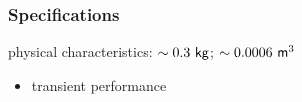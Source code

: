 \subsubsection{Specifications}
physical characteristics: $\sim 0.3 \ \mathsf{kg}$; $\sim 0.0006 \ \mathsf{m}^3$
\begin{itemize}
    \item transient performance
\end{itemize}

